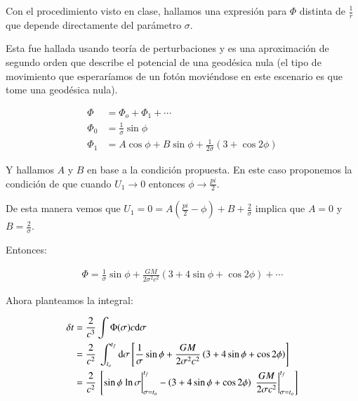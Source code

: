 

Con el procedimiento visto en clase, hallamos una expresión para $\Phi$ distinta de $\frac{1}{r}$ que depende directamente del parámetro $\sigma$.

Esta fue hallada usando teoría de perturbaciones y es una aproximación de segundo orden que describe el potencial de una geodésica nula (el tipo de movimiento que esperaríamos de un fotón moviéndose en este escenario es que tome una geodésica nula).

\begin{align}
    \Phi &= \Phi_o+\Phi_1+\cdots\\
    \Phi_0&=\frac{1}{\sigma}\sin\phi\\
    \Phi_1&=A\cos\phi+B\sin\phi+\frac{1}{2\sigma}\left(3+\cos2\phi\right)
\end{align}

Y hallamos $A$ y $B$ en base a la condición propuesta. En este caso proponemos la condición de que cuando $U_1\rightarrow0$ entonces $\phi\rightarrow\frac{pi}{2}$.

De esta manera vemos que $U_1=0=A\left(\frac{pi}{2}-\phi\right)+B+\frac{2}{\sigma}$ implica que $A=0$ y $B=\frac{2}{\sigma}$.

Entonces:

\begin{align*}
    \Phi = \frac{1}{\sigma}\sin\phi+\frac{GM}{2\sigma^2c^2}\left(3+4\sin\phi+\cos2\phi\right)+\cdots
\end{align*}

Ahora planteamos la integral:

\begin{align*}
    \delta t 
    &= \frac{2}{c^3}\int \Phi(\sigma) c\dd \sigma\\
    &= \frac{2}{c^2} ~\int_{t_o}^{t_f} \dd \sigma \left[\frac{1}{\sigma} \sin\phi+\frac{GM}{2\sigma^2c^2}\left(3+4\sin\phi+\cos2\phi\right)\right]\\
    &= \frac{2}{c^2} ~\left[\sin\phi \eval*{\ln\sigma}_{\sigma = t_o}^{t_f}-\left(3+4\sin\phi+\cos2\phi\right)\eval*{\frac{GM}{2\sigma c^2}}_{\sigma = t_o}^{t_f}\right]
\end{align*}


